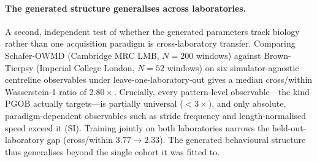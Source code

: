 \documentclass[11pt]{article}
\begin{document}
\paragraph{The generated structure generalises across laboratories.} A second, independent test of whether the generated parameters track biology rather than one acquisition paradigm is cross-laboratory transfer. Comparing Schafer-OWMD (Cambridge MRC LMB, $N{=}200$ windows) against Brown-Tierpsy (Imperial College London, $N{=}52$ windows) on six simulator-agnostic centreline observables under leave-one-laboratory-out gives a median cross/within Wasserstein-1 ratio of $2.80\times$. Crucially, every pattern-level observable---the kind PGOB actually targets---is partially universal ($<3\times$), and only absolute, paradigm-dependent observables such as stride frequency and length-normalised speed exceed it (SI). Training jointly on both laboratories narrows the held-out-laboratory gap (cross/within $3.77\to2.33$). The generated behavioural structure thus generalises beyond the single cohort it was fitted to.
\end{document}
